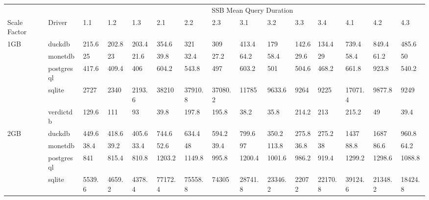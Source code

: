 \begin{table}[]
\begin{tabular}{ll|lllllllllllll}
                     &            & \multicolumn{13}{c|}{SSB Mean Query Duration}                                                                                           \\
Scale Factor         & Driver     & 1.1     & 1.2     & 1.3     & 2.1      & 2.2      & 2.3      & 3.1      & 3.2      & 3.3      & 3.4      & 4.1      & 4.2     & 4.3     \\ \hline
\multirow{5}{*}{1GB} & duckdb     & 215.6   & 202.8   & 203.4   & 354.6    & 321      & 309      & 413.4    & 179      & 142.6    & 134.4    & 739.4    & 849.4   & 485.6   \\
                     & monetdb    & 25      & 23      & 21.6    & 39.8     & 32.4     & 27.2     & 64.2     & 58.4     & 29.6     & 29       & 58.4     & 61.2    & 50      \\
                     & postgresql & 417.6   & 409.4   & 406     & 604.2    & 543.8    & 497      & 603.2    & 501      & 504.6    & 468.2    & 661.8    & 923.8   & 540.2   \\
                     & sqlite     & 2727    & 2340    & 2193.6  & 38210    & 37910.8  & 37080.2  & 11785    & 9633.6   & 9264     & 9225     & 17071.4  & 9877.8  & 9249    \\
                     & verdictdb  & 129.6   & 111     & 93      & 39.8     & 197.8    & 195.8    & 38.2     & 35.8     & 214.2    & 213      & 215.2    & 49      & 39.4    \\ \hline
\multirow{5}{*}{2GB} & duckdb     & 449.6   & 418.6   & 405.6   & 744.6    & 634.4    & 594.2    & 799.6    & 350.2    & 275.8    & 275.2    & 1437     & 1687    & 960.8   \\
                     & monetdb    & 38.4    & 39.2    & 33.4    & 52.6     & 48       & 39.4     & 97       & 113.8    & 36.8     & 38       & 88.8     & 86.6    & 64.2    \\
                     & postgresql & 841     & 815.4   & 810.8   & 1203.2   & 1149.8   & 995.8    & 1200.4   & 1001.6   & 986.2    & 919.4    & 1299.2   & 1298.6  & 1088.8  \\
                     & sqlite     & 5539.6  & 4659.2  & 4378.4  & 77172.4  & 75558.8  & 74305    & 28741.8  & 23346.2  & 22072    & 22170.8  & 39124.6  & 21348.2 & 18424.8 \\

\end{tabular}
\end{table}
